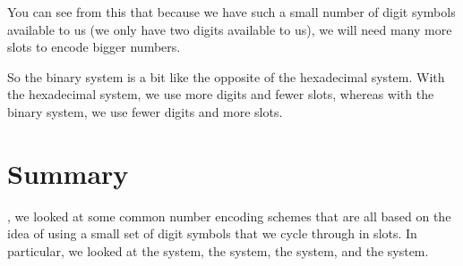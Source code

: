 \documentclass[../../../main.tex]{subfiles}
\begin{document}
You can see from this that because we have such a small number of digit symbols available to us (we only have two digits available to us), we will need many more slots to encode bigger numbers. 

So the binary system is a bit like the opposite of the hexadecimal system. With the hexadecimal system, we use more digits and fewer slots, whereas with the binary system, we use fewer digits and more slots. 


\section{Summary}

, we looked at some common number encoding schemes that are all based on the idea of using a small set of digit symbols that we cycle through in slots. In particular, we looked at the  system, the  system, the  system, and the  system.
\end{document}
